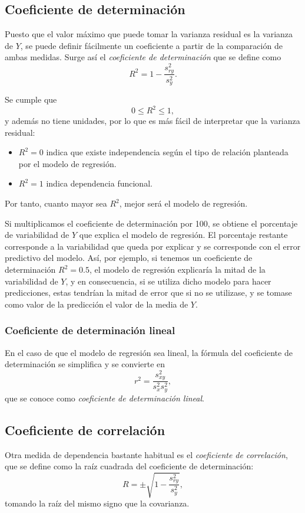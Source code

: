 \subsection{Coeficiente de determinación}
Puesto que el valor máximo que puede tomar la varianza residual es la varianza
de $Y$, se puede definir fácilmente un coeficiente a partir de la comparación
de ambas medidas. Surge así el \emph{coeficiente de determinación} que se
define como
\[
R^2=1-\frac{s^2_{ry}}{s_y^2}.
\]

Se cumple que
\[ 0\leq R^2\leq 1,\]
y además no tiene unidades, por lo que es más fácil de interpretar que la
varianza residual:
\begin{itemize}
\item $R^2=0$ indica que existe independencia según el
tipo de relación planteada por el modelo de regresión.
\item $R^2=1$ indica dependencia funcional.
\end{itemize}
Por tanto, cuanto mayor sea $R^2$, mejor será el modelo de regresión.

Si multiplicamos el coeficiente de determinación por 100, se obtiene el
porcentaje de variabilidad de $Y$ que explica el modelo de regresión. El
porcentaje restante corresponde a la variabilidad que queda por explicar y se
corresponde con el error predictivo del modelo. Así, por ejemplo, si tenemos
un coeficiente de determinación $R^2=0.5$, el modelo de regresión explicaría
la mitad de la variabilidad de $Y$, y en consecuencia, si se utiliza dicho
modelo para hacer predicciones, estas tendrían la mitad de error que si no se
utilizase, y se tomase como valor de la predicción el valor de la media de $Y$.

\subsubsection{Coeficiente de determinación lineal}
En el caso de que el modelo de regresión sea lineal, la fórmula del
coeficiente de determinación se simplifica y se convierte en
\[
r^2=\frac{s_{xy}^2}{s_x^2 s_y^2},
\]
que se conoce como \emph{coeficiente de determinación lineal}.

\subsection{Coeficiente de correlación}
Otra medida de dependencia bastante habitual es el \emph{coeficiente de
correlación}, que se define como la raíz cuadrada del coeficiente de
determinación:
\[
R=\pm\sqrt{1-\frac{s^2_{ry}}{s_y^2}},
\]
tomando la raíz del mismo signo que la covarianza.

